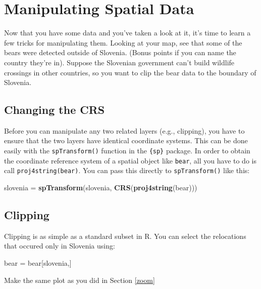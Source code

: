 \documentclass[]{book}
\newenvironment{Shaded}{\begin{snugshade}}{\end{snugshade}}
\newcommand{\KeywordTok}[1]{\textcolor[rgb]{0.13,0.29,0.53}{\textbf{#1}}}
\newcommand{\StringTok}[1]{\textcolor[rgb]{0.31,0.60,0.02}{#1}}
\newcommand{\NormalTok}[1]{#1}
\theoremstyle{definition}
\theoremstyle{definition}
\theoremstyle{definition}
\theoremstyle{remark}
\begin{document}
\section{Manipulating Spatial Data}\label{ManipSpat}

Now that you have some data and you've taken a look at it, it's time to
learn a few tricks for manipulating them. Looking at your map, see that
some of the bears were detected outside of Slovenia. (Bonus points if
you can name the country they're in). Suppose the Slovenian government
can't build wildlife crossings in other countries, so you want to clip
the bear data to the boundary of Slovenia.

\subsection{Changing the CRS}\label{crs}

Before you can manipulate any two related layers (e.g., clipping), you
have to ensure that the two layers have identical coordinate systems.
This can be done easily with the \texttt{spTransform()} function in the
\texttt{\{sp\}} package. In order to obtain the coordinate reference
system of a spatial object like \texttt{bear}, all you have to do is
call \texttt{proj4string(bear)}. You can pass this directly to
\texttt{spTransform()} like this:

\begin{Shaded}
\begin{Highlighting}[]
\NormalTok{slovenia =}\StringTok{ }\KeywordTok{spTransform}\NormalTok{(slovenia, }\KeywordTok{CRS}\NormalTok{(}\KeywordTok{proj4string}\NormalTok{(bear))) }
\end{Highlighting}
\end{Shaded}

\subsection{Clipping}\label{clip}

Clipping is as simple as a standard subset in R. You can select the
relocations that occured only in Slovenia using:

\begin{Shaded}
\begin{Highlighting}[]
\NormalTok{bear =}\StringTok{ }\NormalTok{bear[slovenia,]}
\end{Highlighting}
\end{Shaded}

Make the same plot as you did in Section \ref{zoom}
\end{document}
